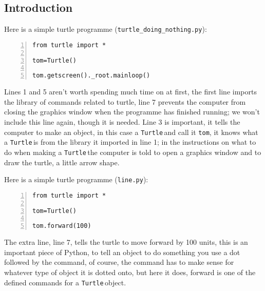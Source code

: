 \documentclass[11pt,a4paper]{scrartcl}
\newcommand{\turtle}{\texttt{Turtle}\,}
\begin{document}
\subsection*{Introduction}
Here is a simple turtle programme (\texttt{turtle\_doing\_nothing.py}):
\begin{lstlisting}[numbers=left]
from turtle import *

tom=Turtle()

tom.getscreen()._root.mainloop()
\end{lstlisting}
Lines 1 and 5 aren't worth spending much time on at first, the first
line imports the library of commands related to turtle, line 7
prevents the computer from closing the graphics window when the
programme has finished running; we won't include this line again,
though it is needed. Line 3 is important, it tells the computer to
make an object, in this case a \turtle and call it \texttt{tom}, it
knows what a \turtle is from the library it imported in line 1; in the
instructions on what to do when making a \turtle the computer is told
to open a graphics window and to draw the turtle, a little arrow
shape.

Here is a simple turtle programme (\texttt{line.py}):
\begin{lstlisting}[numbers=left]
from turtle import *

tom=Turtle()

tom.forward(100)
\end{lstlisting}
The extra line, line 7, tells the turtle to move forward by 100 units, this is an important piece of Python, to tell an object to do something you use a dot followed by the command, of course, the command has to make sense for whatever type of object it is dotted onto, but here it does, forward is one of the defined commands for a \turtle object. 
\end{document}
